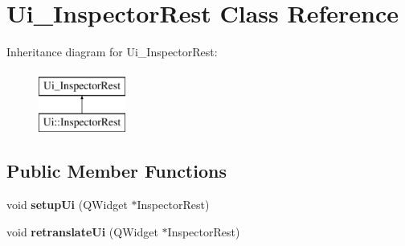 \hypertarget{class_ui___inspector_rest}{}\section{Ui\+\_\+\+Inspector\+Rest Class Reference}
\label{class_ui___inspector_rest}
Inheritance diagram for Ui\+\_\+\+Inspector\+Rest\+:\begin{figure}[H]
\begin{center}
\leavevmode
\includegraphics[height=2.000000cm]{class_ui___inspector_rest}
\end{center}
\end{figure}
\subsection*{Public Member Functions}
\begin{DoxyCompactItemize}
\item 
\mbox{\label{class_ui___inspector_rest_a5e576acbe580d02a73fb5025859370be}} 
void {\bfseries setup\+Ui} (Q\+Widget $\ast$Inspector\+Rest)
\item 
\mbox{\label{class_ui___inspector_rest_a75fa2c6bd60d0abb2d7867c351944e83}} 
void {\bfseries retranslate\+Ui} (Q\+Widget $\ast$Inspector\+Rest)
\end{DoxyCompactItemize}
